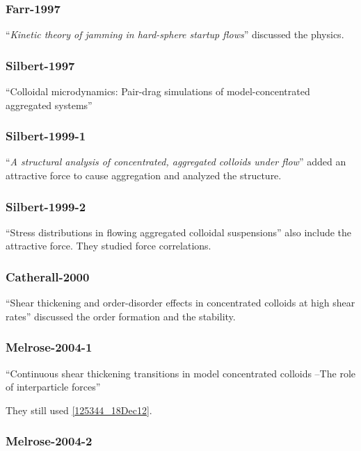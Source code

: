 \documentclass[11pt]{scrartcl}
\begin{document}
\subsubsection*{Farr-1997}

\citet{Farr_1997} 
``\emph{Kinetic theory of jamming in hard-sphere startup flows}''
discussed the physics.

\subsubsection*{Silbert-1997}
\citet{Silbert_1997}
``Colloidal microdynamics: Pair-drag simulations of model-concentrated aggregated systems''


\subsubsection*{Silbert-1999-1}
\citet{Silbert_1999}
``\emph{A structural analysis of concentrated, aggregated colloids under flow}''
added an attractive force to cause 
aggregation and analyzed the structure.

\subsubsection*{Silbert-1999-2}
\citet{Silbert_1999a}
``Stress distributions in flowing aggregated colloidal suspensions''
also include the attractive force.
%
They studied force correlations.

\subsubsection*{Catherall-2000}

\citet{Catherall_2000}
``Shear thickening and order-disorder effects in concentrated colloids at high shear rates''
discussed the order formation and the stability.

\subsubsection*{Melrose-2004-1}

\citet{Melrose_2004a}
``Continuous shear thickening transitions in model concentrated colloids
--The role of interparticle forces''

They still used \eqref{125344_18Dec12}.

\subsubsection*{Melrose-2004-2}
\end{document}
